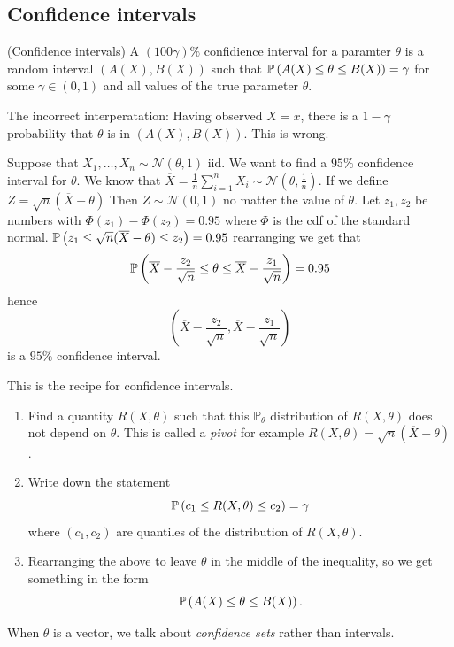 \documentclass{article}
\begin{document}
\subsection{Confidence intervals}
\begin{definition}
	(Confidence intervals) A $ (100\gamma)\%$ confidience interval for a paramter $ \theta $ is a random interval $ (A(X),B(X)) $ such that $ \mathbb{P}\left({A(X)\le \theta\le B(X)}\right)= \gamma $ for some $ \gamma\in (0,1)  $ and all values of the true parameter $ \theta $. 
\end{definition}
\begin{remark}
  The incorrect interperatation: Having observed $ X=x $, there is a $ 1-\gamma $ probability that $ \theta $ is in $ (A(X),B(X)) $. This is wrong.
\end{remark}
Suppose that $ X_1,\dots, X_n\sim \mathcal N(\theta,1) $ iid. We want to find a $ 95\% $ confidence interval for $ \theta $. We know that $ \overline X = \frac 1n \sum_{i=1}^n X_i\sim \mathcal N(\theta,\frac 1n) $. If we define $ Z = \sqrt n (\overline X - \theta) $ Then $ Z\sim \mathcal N(0,1) $ no matter the value of $ \theta $. Let $ z_1,z_2 $ be numbers with $ \Phi(z_1)-\Phi(z_2) = 0.95 $ where $ \Phi $ is the cdf of the standard normal. $ \mathbb{P}\left({z_1\le \sqrt n(\overline X-\theta)\le z_2}\right) = 0.95 $ rearranging we get that
\begin{align*}
	\mathbb{P}\left({\overline X - \frac{z_2}{\sqrt n} \le \theta\le \overline X - \frac{z_1}{\sqrt n}}\right) = 0.95
\end{align*}
hence 
\[
	\left(\overline X - \frac{z_2}{\sqrt n}, \overline X - \frac{z_1}{\sqrt n}\right)
\]
is a $ 95\% $ confidence interval.\par
This is the recipe for confidence intervals.
\begin{enumerate}
	\item Find a quantity $ R(X,\theta) $ such that this $ \mathbb P_\theta $ distribution of $ R(X,\theta) $ does not depend on $ \theta $. This is called a \textit{pivot} for example $ R(X,\theta) = \sqrt n(\overline X-\theta) $.
	\item Write down the statement
		\[
			\mathbb{P}\left({c_1\le R(X,\theta)\le c_2}\right)=\gamma
		\]
		where $ (c_1,c_2) $ are quantiles of the distribution of $ R(X,\theta) $. 
	\item Rearranging the above to leave $ \theta $ in the middle of the inequality, so we get something in the form
		\[
			\mathbb{P}\left({A(X)\le \theta \le B(X)}\right).
		\]
\end{enumerate}
\begin{remark}
	When $ \theta $ is a vector, we talk about \textit{confidence sets} rather than intervals.
\end{remark}
\end{document}
